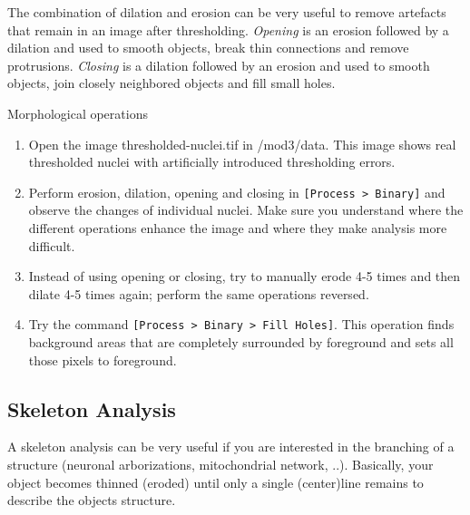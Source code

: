 The combination of dilation and erosion can be very useful to remove artefacts that remain in an image after thresholding. \emph{Opening} is an erosion followed by a dilation and used to smooth objects, break thin connections and remove protrusions. \emph{Closing} is a dilation followed by an erosion and used to smooth objects, join closely neighbored objects and fill small holes. 

\begin{taskbox}{Morphological operations}
\begin{enumerate}
	\item Open the image thresholded-nuclei.tif in /mod3/data. This image shows real thresholded nuclei with artificially introduced thresholding errors. 
	\item Perform erosion, dilation, opening and closing in \texttt{[Process > Binary]} and observe the changes of individual nuclei. Make sure you understand where the different operations enhance the image and where they make analysis more difficult.
	\item Instead of using opening or closing, try to manually erode 4-5 times and then dilate 4-5 times again; perform the same operations reversed. 
	\item Try the command \texttt{[Process > Binary > Fill Holes]}. This operation finds background areas that are completely surrounded by foreground and sets all those pixels to foreground.
	\end{enumerate}
\end{taskbox}

\subsection{Skeleton Analysis}
A skeleton analysis can be very useful if you are interested in the branching of a structure (neuronal arborizations, mitochondrial network, ..). Basically, your object becomes thinned (eroded) until only a single (center)line remains to describe the objects structure. 

